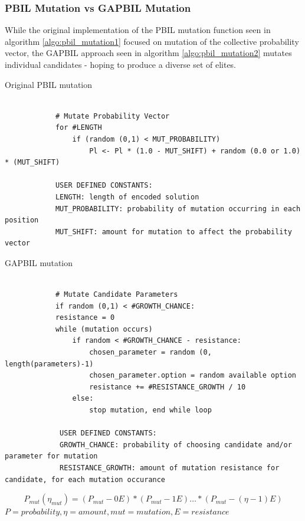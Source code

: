 \documentclass[a4paper,english]{report}
\begin{document}
		\subsubsection{PBIL Mutation vs GAPBIL Mutation}
		While the original implementation of the PBIL mutation function seen in algorithm \ref{algo:pbil_mutation1} focused on mutation of the collective probability vector, the GAPBIL approach seen in algorithm \ref{algo:pbil_mutation2} mutates individual candidates - hoping to produce a diverse set of elites.
		
		\begin{algorithm}
			\caption{Original PBIL mutation}\label{algo:pbil_mutation1}
		\scriptsize
			\begin{verbatim}
			
			# Mutate Probability Vector
			for #LENGTH
			    if (random (0,1) < MUT_PROBABILITY)
			        Pl <- Pl * (1.0 - MUT_SHIFT) + random (0.0 or 1.0) * (MUT_SHIFT)
				        
			USER DEFINED CONSTANTS:
			LENGTH: length of encoded solution
			MUT_PROBABILITY: probability of mutation occurring in each position
			MUT_SHIFT: amount for mutation to affect the probability vector

			\end{verbatim}
		\end{algorithm}
		\begin{algorithm}
		\caption{GAPBIL mutation}\label{algo:pbil_mutation2}
		\scriptsize
			\begin{verbatim}
			
			# Mutate Candidate Parameters
			if random (0,1) < #GROWTH_CHANCE:
			resistance = 0
			while (mutation occurs)
			    if random < #GROWTH_CHANCE - resistance:
			        chosen_parameter = random (0, length(parameters)-1)
			        chosen_parameter.option = random available option 
			        resistance += #RESISTANCE_GROWTH / 10
			    else:
			        stop mutation, end while loop
			        
			 USER DEFINED CONSTANTS:
			 GROWTH_CHANCE: probability of choosing candidate and/or parameter for mutation
			 RESISTANCE_GROWTH: amount of mutation resistance for candidate, for each mutation occurance
		\end{verbatim}
		\end{algorithm}
			\begin{equation}\label{math:mutation_chance}
			P_{mut}(\eta_{mut}) = (P_{mut}-0 E) * (P_{mut}-1 E) \ldots * (P_{mut}-(\eta-1) E)
			\end{equation}
			{\centering
				\begin{math}
				P = probability, \eta = amount, mut = mutation, E = resistance
				\end{math}\\
			}
\end{document}
